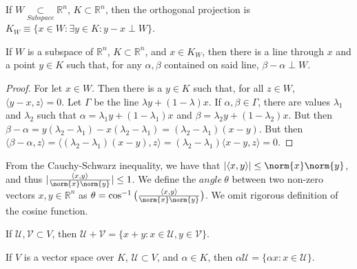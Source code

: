 \documentclass[crop=false,class=book]{standalone}
\begin{document}
\begin{definition}
If $W\underset{Subspace}\subset\mathbb{R}^n$, $K \subset \mathbb{R}^n$, then the orthogonal projection is $K_{W}\equiv\{x\in W: \exists y\in K: y-x \perp W\}$.
\end{definition}
\begin{theorem}
If $W$ is a subspace of $\mathbb{R}^n$, $K \subset \mathbb{R}^n$, and $x\in K_{W}$, then there is a line through $x$ and a point $y\in K$ such that, for any $\alpha, \beta$ contained on said line, $\beta-\alpha \perp W$.
\end{theorem}
\begin{proof}
For let $x\in W$. Then there is a $y\in K$ such that, for all $z\in W$, $\langle y-x,z\rangle = 0$. Let $\Gamma$ be the line $\lambda y + (1-\lambda)x$. If $\alpha,\beta \in \Gamma$, there are values $\lambda_1$ and $\lambda_2$ such that $\alpha = \lambda_1 y+ (1-\lambda_1)x$ and $\beta = \lambda_2 y +(1-\lambda_2)x$. But then $\beta-\alpha = y(\lambda_2-\lambda_1)-x(\lambda_2-\lambda_1) = (\lambda_2-\lambda_1)(x-y)$. But then $\langle \beta - \alpha,z\rangle = \langle (\lambda_2-\lambda_1)(x-y),z\rangle = (\lambda_2-\lambda_1)\langle x-y,z \rangle = 0$.
\end{proof}
\begin{remark}
From the Cauchy-Schwarz inequality, we have that $|\langle x,y \rangle| \leq \norm{x}\norm{y}$, and thus $|\frac{\langle x,y \rangle}{\norm{x}\norm{y}}| \leq 1$. We define the $angle\ \theta$ between two non-zero vectors $x,y\in \mathbb{R}^n$ as $\theta=\cos^{-1}\big(\frac{\langle x,y \rangle}{\norm{x}\norm{y}}\big)$. We omit rigorous definition of the cosine function.
\end{remark}
\begin{definition}
If $\mathcal{U},\mathcal{V}\subset V$, then $\mathcal{U}+\mathcal{V} = \{x+y:x\in \mathcal{U},y\in \mathcal{V}\}$.
\end{definition}
\begin{definition}
If $V$ is a vector space over $K$, $\mathcal{U}\subset V$, and $\alpha \in K$, then $\alpha \mathcal{U} = \{\alpha x:x\in \mathcal{U}\}$.
\end{definition}
\end{document}
